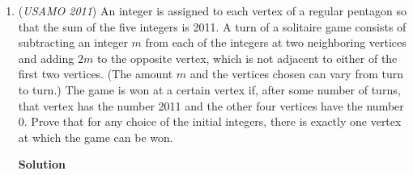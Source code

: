 \begin{enumerate}
 We now evaluate each part separately.Note that 
 \[\frac{ab+\frac{a^2+b^2}{2}}{(a+b)^2} = \frac{\frac{(a+b)^2}{2}}{(a+b)^2} = \frac{1}{2}.\]Therefore, 
 \[\sum_{\text{cyc}} \frac{ab+\frac{a^2+b^2}{2}}{(a+b)^2} = \frac{3}{2}.\]By the RMS-AM inequality, we have $(a+c)^2 \leq 2(a^2+c^2)$, which gives $\frac{1}{(a+c)^2} \geq \frac{1}{2(a^2+c^2)}$. Thus,\begin{align*}\sum_{\text{cyc}} \frac{\frac{a^2+c^2}{2}}{(a+c)^2} &\geq \sum_{\text{cyc}} \frac{\frac{a^2+c^2}{2}}{2(a^2+c^2)} \\&= \sum_{\text{cyc}} \frac{1}{4} = \frac{3}{4}.\end{align*}
The remaining terms can be written as:\begin{align*}\sum_{\text{cyc}} \frac{\frac{ac+bc}{2}}{(a+b)^2} &= \frac{1}{2}\sum_{\text{cyc}} \frac{c(a+b)}{(a+b)^2} \\&= \frac{1}{2}\sum_{\text{cyc}} \frac{c}{a+b} \\&= \frac{1}{2}\left(\frac{a}{b+c}+\frac{b}{a+c}+\frac{c}{a+b}\right).\end{align*}
By Nesbitt's inequality, 
 \[\frac{a}{b+c}+\frac{b}{a+c}+\frac{c}{a+b} \geq \frac{3}{2},\]so this part contributes at least $\frac{3}{4}$.Adding all three parts together:
 \[\frac{ab+1}{(a+b)^2}+\frac{bc+1}{(b+c)^2}+\frac{ac+1}{(a+c)^2} \geq \frac{3}{2}+\frac{3}{4}+\frac{3}{4} = 3.\]

 Therefore, the inequality is proven. $\square$



	\item (\textit{USAMO 2011}) An integer is assigned to each vertex of a regular pentagon so that the sum of the five integers is 2011. A turn of a solitaire game consists of subtracting an integer $m$ from each of the integers at two neighboring vertices and adding $2m$ to the opposite vertex, which is not adjacent to either of the first two vertices. (The amount $m$ and the vertices chosen can vary from turn to turn.) The game is won at a certain vertex if, after some number of turns, that vertex has the number 2011 and the other four vertices have the number 0. Prove that for any choice of the initial integers, there is exactly one vertex at which the game can be won.


 



\textbf{Solution}


\end{enumerate}
